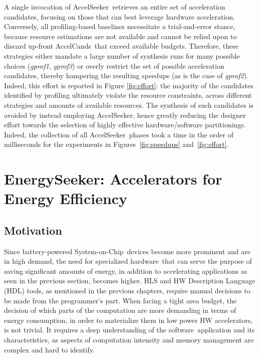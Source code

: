 \documentclass[]{usiinfthesis}
\newcommand{\aseeker}{{AccelSeeker}}
\newcommand{\HW}{{hardware}}
\newcommand{\SW}{{software}}
\newcommand{\SoC}{{System-on-Chip}}
\newcommand{\candidates}{{AccelCand}s}
\begin{document}
A single invocation of \aseeker\ retrieves an entire set of
acceleration candidates, focusing on those that can best leverage
hardware acceleration.  Conversely, all profiling-based baselines
necessitate a trial-and-error stance, because resource estimations are
not available and cannot be relied upon to discard up-front
\candidates\ that exceed available budgets.  Therefore, these
strategies either mandate a large number of synthesis runs for many
possible choices (\emph{gprof1}, \emph{gprof3}) or overly restrict the
set of possible acceleration candidates, thereby hampering the
resulting speedups (as is the case of \emph{gprof2}).  Indeed, this
effort is reported in Figure \ref{fig:effort}: the majority of the
candidates identified by profiling ultimately violate the resource
constraints, across different strategies and amounts of available
resources. The synthesis of such candidates is avoided by instead
employing \aseeker, hence greatly reducing the designer effort towards
the selection of highly effective hardware/software partitionings.
Indeed, the collection of all \aseeker\ phases took a time in the
order of milliseconds for the experiments in
Figures~\ref{fig:speedups} and~\ref{fig:effort}.





% 
%
%
%
%


\clearpage
\section{EnergySeeker: Accelerators for Energy Efficiency}
\label{sec:energy}



\subsection{Motivation}

Since battery-powered \SoC\ devices become more prominent and are in high demand, the need
for specialized \HW\ that can serve the purpose of 
saving significant amounts of energy, in addition to accelerating applications as seen 
in the previous section, becomes higher. 
HLS and HW Description Language (HDL) tools, as mentioned in the previous chapters, require 
manual decisions to be made from the programmer's part. 
When 
facing a tight area budget, the decision of which parts of the computation are more
demanding in terms of energy consumption, in order to 
 materialize them in low power HW accelerators, is not 
trivial. It requires a deep understanding of the \SW\ application 
and its characteristics, as aspects of computation intensity and memory 
management are complex and hard to identify.\par
\end{document}
